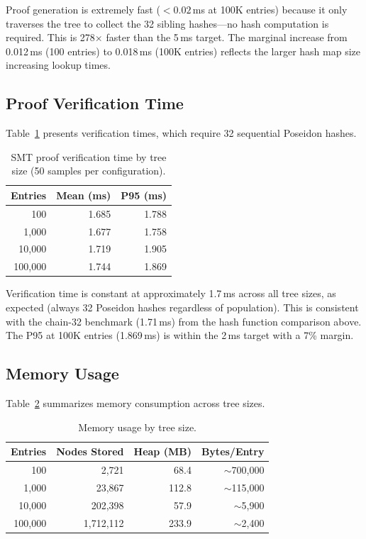 Proof generation is extremely fast ($< 0.02$\,ms at 100K entries) because it only traverses the tree to collect the 32 sibling hashes---no hash computation is required. This is 278$\times$ faster than the 5\,ms target. The marginal increase from 0.012\,ms (100 entries) to 0.018\,ms (100K entries) reflects the larger hash map size increasing lookup times.

\subsection{Proof Verification Time}

Table~\ref{tab:proof-verify} presents verification times, which require 32 sequential Poseidon hashes.

\begin{table}[htbp]
\centering
\caption{SMT proof verification time by tree size (50 samples per configuration).}
\label{tab:proof-verify}
\begin{tabular}{rrr}
\hline
\textbf{Entries} & \textbf{Mean (ms)} & \textbf{P95 (ms)} \\
\hline
100 & 1.685 & 1.788 \\
1{,}000 & 1.677 & 1.758 \\
10{,}000 & 1.719 & 1.905 \\
100{,}000 & 1.744 & 1.869 \\
\hline
\end{tabular}
\end{table}

Verification time is constant at approximately 1.7\,ms across all tree sizes, as expected (always 32 Poseidon hashes regardless of population). This is consistent with the chain-32 benchmark (1.71\,ms) from the hash function comparison above. The P95 at 100K entries (1.869\,ms) is within the 2\,ms target with a 7\% margin.

\subsection{Memory Usage}

Table~\ref{tab:memory} summarizes memory consumption across tree sizes.

\begin{table}[htbp]
\centering
\caption{Memory usage by tree size.}
\label{tab:memory}
\begin{tabular}{rrrr}
\hline
\textbf{Entries} & \textbf{Nodes Stored} & \textbf{Heap (MB)} & \textbf{Bytes/Entry} \\
\hline
100 & 2{,}721 & 68.4 & $\sim$700{,}000 \\
1{,}000 & 23{,}867 & 112.8 & $\sim$115{,}000 \\
10{,}000 & 202{,}398 & 57.9 & $\sim$5{,}900 \\
100{,}000 & 1{,}712{,}112 & 233.9 & $\sim$2{,}400 \\
\hline
\end{tabular}
\end{table}

